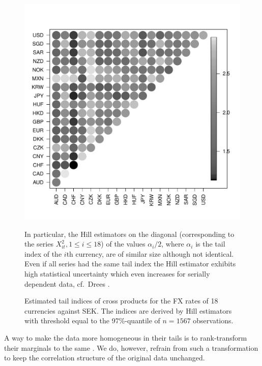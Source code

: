 \begin{figure}[h]
  \begin{minipage}{0.55\linewidth}
    \includegraphics[width=1.0\linewidth]
    {FX_HillEstimates.pdf}
  \end{minipage}
  \begin{minipage}[0.42\linewidth]{0.42\linewidth}
    In particular, 
    the Hill estimators on the diagonal (corresponding to the series
    $X_{it}^2, 1 \leq i \leq 18$) of the values $\alpha_i/2$, where
    $\alpha_i$ is the tail index of the $i$th currency, are of similar
    size although not identical. Even if all series had the same tail
    index the Hill estimator exhibits high statistical uncertainty which
    even increases for serially dependent data, cf.\ Drees
    \cite{drees:2003}.
  \end{minipage}
  \caption{Estimated tail indices of cross products for the FX rates
    of 18 currencies against SEK. The indices are derived by Hill
    estimators with threshold equal to the 97\%-quantile of $n=1567$
    observations.}
  \label{Fig:Hill}
\end{figure}

A way to make the data more homogeneous in their tails is to
rank-transform their marginals to the same \ds . We do, however,
refrain from such a  transformation to keep the correlation structure
of the original data unchanged. 

